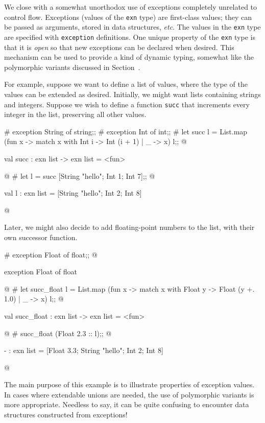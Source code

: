 
We close with a somewhat unorthodox use of exceptions completely unrelated to control
flow.  Exceptions (values of the \hbox{\lstinline/exn/} type) are first-class values; they can be passed as
arguments, stored in data structures, \emph{etc}.  The values in the \hbox{\lstinline/exn/} type are specified with
\hbox{\lstinline/exception/} definitions.  One unique property of the \hbox{\lstinline/exn/} type is that it is \emph{open}
so that new exceptions can be declared when desired.  This mechanism can be used to provide a kind of
dynamic typing, somewhat like the polymorphic variants discussed in Section~.

For example, suppose we want to define a list of values, where the type of the values can be
extended as desired.  Initially, we might want lists containing strings and integers.  Suppose we
wish to define a function \hbox{\lstinline/succ/} that increments every integer in the list, preserving all
other values.

\begin{ocaml}
# exception String of string;;
# exception Int of int;;
# let succ l =
     List.map (fun x ->
        match x with
           Int i -> Int (i + 1)
         | _ -> x) l;;
@
\begin{topoutput}
val succ : exn list -> exn list = <fun>
\end{topoutput}
@
# let l = succ [String "hello"; Int 1; Int 7];;
@
\begin{topoutput}
val l : exn list = [String "hello"; Int 2; Int 8]
\end{topoutput}
@
\end{ocaml}
%
Later, we might also decide to add floating-point numbers to the list, with their own successor function.

\begin{ocaml}
# exception Float of float;;
@
\begin{topoutput}
exception Float of float
\end{topoutput}
@
# let succ_float l =
     List.map (fun x ->
        match x with
           Float y -> Float (y +. 1.0)
         | _ -> x) l;;
@
\begin{topoutput}
val succ_float : exn list -> exn list = <fun>
\end{topoutput}
@
# succ_float (Float 2.3 :: l);;
@
\begin{topoutput}
- : exn list = [Float 3.3; String "hello"; Int 2; Int 8]
\end{topoutput}
@
\end{ocaml}
%
The main purpose of this example is to illustrate properties of exception values. In cases where
extendable unions are needed, the use of polymorphic variants is more appropriate. Needless to say,
it can be quite confusing to encounter data structures constructed from exceptions!

